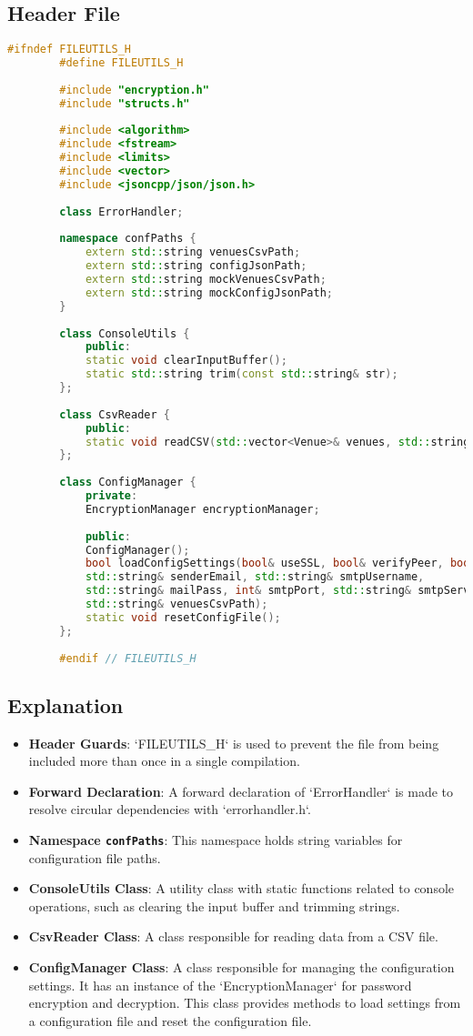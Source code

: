 \documentclass{article}
\begin{document}
	\subsection*{Header File}
	\begin{lstlisting}[language=C++]
		#ifndef FILEUTILS_H
		#define FILEUTILS_H
		
		#include "encryption.h"
		#include "structs.h"
		
		#include <algorithm>
		#include <fstream> 
		#include <limits>
		#include <vector>
		#include <jsoncpp/json/json.h>
		
		class ErrorHandler;
		
		namespace confPaths {
			extern std::string venuesCsvPath;
			extern std::string configJsonPath;
			extern std::string mockVenuesCsvPath;
			extern std::string mockConfigJsonPath;
		}
		
		class ConsoleUtils {
			public:
			static void clearInputBuffer();
			static std::string trim(const std::string& str);
		};
		
		class CsvReader {
			public:
			static void readCSV(std::vector<Venue>& venues, std::string& venuesCsvPath);
		};
		
		class ConfigManager {
			private:
			EncryptionManager encryptionManager;
			
			public:
			ConfigManager();
			bool loadConfigSettings(bool& useSSL, bool& verifyPeer, bool& verifyHost, bool& verbose, 
			std::string& senderEmail, std::string& smtpUsername, 
			std::string& mailPass, int& smtpPort, std::string& smtpServer, 
			std::string& venuesCsvPath);
			static void resetConfigFile();
		};
		
		#endif // FILEUTILS_H
	\end{lstlisting}
	
	\subsection*{Explanation}
	\begin{itemize}
		\item \textbf{Header Guards}: `FILEUTILS\_H` is used to prevent the file from being included more than once in a single compilation.
		\item \textbf{Forward Declaration}: A forward declaration of `ErrorHandler` is made to resolve circular dependencies with `errorhandler.h`.
		\item \textbf{Namespace \texttt{confPaths}}: This namespace holds string variables for configuration file paths.
		\item \textbf{ConsoleUtils Class}: A utility class with static functions related to console operations, such as clearing the input buffer and trimming strings.
		\item \textbf{CsvReader Class}: A class responsible for reading data from a CSV file.
		\item \textbf{ConfigManager Class}: A class responsible for managing the configuration settings. It has an instance of the `EncryptionManager` for password encryption and decryption. This class provides methods to load settings from a configuration file and reset the configuration file.
	\end{itemize}
	
\end{document}
